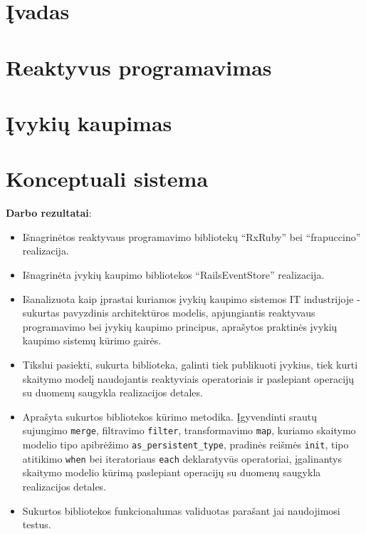 \documentclass{VUMIFPSmagistrinis}
\begin{document}

\tableofcontents

\section{Įvadas}


\section{Reaktyvus programavimas}


\section{Įvykių kaupimas}


\section{Konceptuali sistema}



\textbf{Darbo rezultatai}:

\begin{itemize}
  \item Išnagrinėtos reaktyvaus programavimo bibliotekų ``RxRuby'' bei ``frapuccino'' realizacija.
  \item Išnagrinėta įvykių kaupimo bibliotekos ``RailsEventStore'' realizacija.
  \item Išanalizuota kaip įprastai kuriamos įvykių kaupimo sistemos IT industrijoje - sukurtas pavyzdinis architektūros modelis, apjungiantis reaktyvaus programavimo bei įvykių kaupimo principus, aprašytos praktinės įvykių kaupimo sistemų kūrimo gairės.
  \item Tikslui pasiekti, sukurta biblioteka, galinti tiek publikuoti įvykius, tiek kurti skaitymo modelį naudojantis reaktyviais operatoriais ir paslepiant operacijų su duomenų saugykla realizacijos detales.
  \item Aprašyta sukurtos bibliotekos kūrimo metodika. Įgyvendinti srautų sujungimo \lstinline|merge|, filtravimo \lstinline|filter|, transformavimo \lstinline|map|, kuriamo skaitymo modelio tipo apibrėžimo \lstinline|as_persistent_type|, pradinės reišmės \lstinline|init|, tipo atitikimo \lstinline|when| bei iteratoriaus \lstinline|each| deklaratyvūs operatoriai, įgalinantys skaitymo modelio kūrimą paslepiant operacijų su duomenų saugykla realizacijos detales.
  \item Sukurtos bibliotekos funkcionalumas validuotas parašant jai naudojimosi testus.
\end{itemize}
\end{document}
